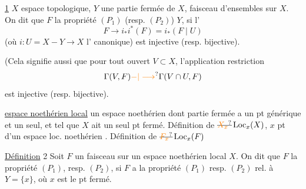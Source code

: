 
\uline{ 1}  $X$ espace topologique, $Y$ une partie fermée
de $X$,  faisceau d'ensembles sur $X$. On dit
que $F$  la propriété $(P_1)$ (resp. $(P_2)$)
  $Y$, si l' 
\[
F\longrightarrow i_*i^*(F)=i_*(F\mid U)
\]
(où $i:U=X-Y\longrightarrow X$  l' canonique)
est injective (resp. bijective).

(Cela signifie  aussi que
pour tout ouvert $V\subset X$, l'application  restriction
\[
\Gamma(V,F)\unsure{-|\longrightarrow}\Gamma(V\cap U,F)
\]
est injective (resp. bijective).

 \uline{espace noethérien local} un espace
noethérien dont  partie fermée  a un
pt générique et un seul, et tel que $X$ ait un
seul pt fermé. Définition de $\deleted{\unsure{X_x}}\operatorname{Loc}_x(X)$, $x$ pt d'un
espace loc. noethérien . Définition de $\deleted{\unsure{F_x}}\operatorname{Loc}_x(F)$

\uline{Définition} 2 Soit $F$ un faisceau sur un espace
noethérien local $X$. On dit que $F$  la
propriété $(P_1)$, resp. $(P_2)$, si  $F$ a la propriété
$(P_1)$ resp. $(P_2)$ rel. à $Y=\{x\}$, où $x$ est le pt fermé.

